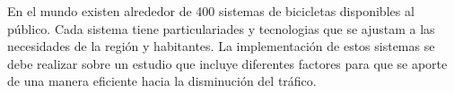 En el mundo existen alrededor de 400 sistemas de bicicletas disponibles al público. Cada sistema tiene particulariades y tecnologias que se ajustam a las necesidades de la región y habitantes. La implementación de estos sistemas se debe realizar sobre un estudio que incluye diferentes factores para que se aporte de una manera eficiente hacia la disminución del tráfico.
